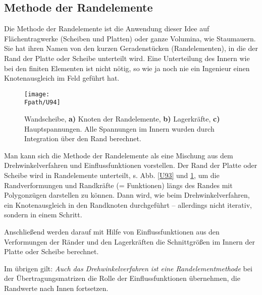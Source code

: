 {{{{%
{\textcolor{sectionTitleBlue}{\section{Methode der Randelemente}}}
Die  Methode der Randelemente ist die Anwendung dieser Idee auf Fl\"{a}chentragwerke (Scheiben und Platten) oder ganze Volumina, wie Staumauern. Sie hat ihren Namen von den kurzen Geradenst\"{u}cken (Randelementen), in die der Rand der Platte oder Scheibe unterteilt wird. Eine Unterteilung des Innern wie bei den finiten Elementen ist nicht n\"{o}tig, so wie ja noch nie ein Ingenieur einen Knotenausgleich \glq im Feld\grq{} gef\"{u}hrt hat.
\begin{figure}[tbp]
\centering
\if {} \sidecaption \fi
\texttt{[image: \\Fpath/U94]}
\caption{Wandscheibe,  \textbf{ a)} Knoten der Randelemente, \textbf{ b)} Lagerkr\"{a}fte, \textbf{ c)} Hauptspannungen. Alle Spannungen im Innern wurden durch Integration \"{u}ber den Rand berechnet.} \label{U94}
\end{figure}%

Man kann sich die Methode der Randelemente als eine Mischung aus dem Drehwinkelverfahren und Einflussfunktionen vorstellen. Der Rand der Platte oder Scheibe wird in Randelemente unterteilt, s. Abb. \ref{U93} und \ref{U94}, um die Randverformungen und Randkr\"{a}fte (= Funktionen) l\"{a}ngs des Randes mit Polygonz\"{u}gen darstellen zu k\"{o}nnen. Dann wird, wie beim Drehwinkelverfahren, ein Knotenausgleich in den Randknoten durchgef\"{u}hrt -- allerdings nicht iterativ, sondern in einem Schritt.

Anschlie{\ss}end werden darauf mit Hilfe von Einflussfunktionen aus den Verformungen der R\"{a}nder und den Lagerkr\"{a}ften die Schnittgr\"{o}{\ss}en im Innern der Platte oder Scheibe berechnet.

Im \"{u}brigen gilt: {\em Auch das Drehwinkelverfahren ist eine Randelementmethode\/} bei der \"{U}bertragungsmatrizen die Rolle der Einflussfunktionen \"{u}bernehmen, die Randwerte nach Innen fortsetzen.

}}}}
